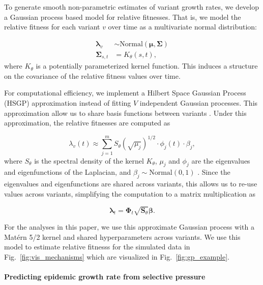 \documentclass[11pt,oneside,letterpaper]{article}
\renewcommand{\vec}[1]{\boldsymbol{#1}}
\begin{document}
To generate smooth non-parametric estimates of variant growth rates, we develop a Gaussian process based model for relative fitnesses.
That is, we model the relative fitness for each variant $v$ over time as a multivariate normal distribution:

\begin{align*}
    \vec{\lambda}_{v} &\sim \text{Normal}(\vec{\mu}, \vec{\Sigma})\\
    \vec{\Sigma}_{s, t} &= K_{\theta}(s, t),
\end{align*}
where $K_{\theta}$ is a potentially parameterized kernel function.
This induces a structure on the covariance of the relative fitness values over time.


For computational efficiency, we implement a Hilbert Space Gaussian Process (HSGP) approximation instead of fitting $V$ independent Gaussian processes.
This approximation allow us to share basis functions between variants \cite{riutortmayol2022practical}.
Under this approximation, the relative fitnesses are computed as

\begin{equation}
    \lambda_{v}(t) \approx \sum_{j=1}^{m} S_{\theta}(\sqrt{\mu_{j}})^{1/2} \cdot \phi_{j}(t) \cdot \beta_{j},
\end{equation}
where $S_{\theta}$ is the spectral density of the kernel $K_\theta$, $\mu_{j}$ and $\phi_{j}$ are the eigenvalues and eigenfunctions of the Laplacian, and $\beta_{j} \sim \text{Normal}(0,1)$ \cite{riutortmayol2022practical}.
Since the eigenvalues and eigenfunctions are shared across variants, this allows us to re-use values across variants, simplifying the computation to a matrix multiplication as

\begin{equation*}
    \vec{\lambda}_{t} = \vec{\Phi}_{t} \sqrt{\vec{S}_{\theta}}\vec{\beta}.
\end{equation*}


For the analyses in this paper, we use this approximate Gaussian process with a Mat\'ern 5/2 kernel and shared hyperparameters across variants.
We use this model to estimate relative fitnesss for the simulated data in Fig.~\ref{fig:vis_mechanisms} which are visualized in Fig.~\ref{fig:gp_example}.

\paragraph{Predicting epidemic growth rate from selective pressure}%
\end{document}
